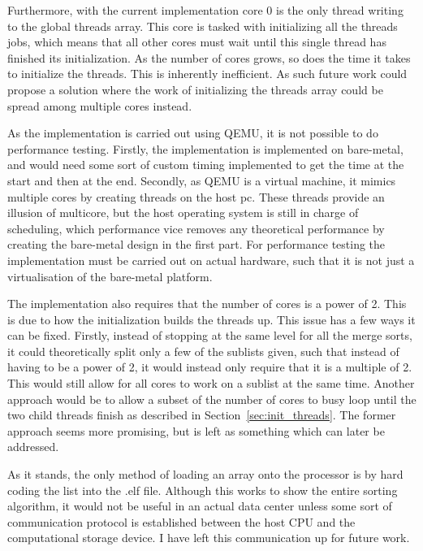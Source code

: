 Furthermore, with the current implementation core 0 is the only thread writing
to the global threads array. This core is tasked with initializing all the
threads jobs, which means that all other cores must wait until this single
thread has finished its initialization. As the number of cores grows, so does
the time it takes to initialize the threads. This is inherently inefficient. As
such future work could propose a solution where the work of initializing the
threads array could be spread among multiple cores instead.

As the implementation is carried out using QEMU, it is not possible to do
performance testing. Firstly, the implementation is implemented on bare-metal,
and would need some sort of custom timing implemented to get the time at the
start and then at the end. Secondly, as QEMU is a virtual machine, it mimics
multiple cores by creating threads on the host pc. These threads provide an
illusion of multicore, but the host operating system is still in charge of
scheduling, which performance vice removes any theoretical performance by
creating the bare-metal design in the first part. For performance testing the
implementation must be carried out on actual hardware, such that it is not just
a virtualisation of the bare-metal platform.

The implementation also requires that the number of cores is a power of 2. This
is due to how the initialization builds the threads up. This issue has a few
ways it can be fixed. Firstly, instead of stopping at the same level for all the
merge sorts, it could theoretically split only a few of the sublists given,
such that instead of having to be a power of 2, it would instead only require
that it is a multiple of 2. This would still allow for all cores to work on a
sublist at the same time. Another approach would be to allow a subset of the
number of cores to busy loop until the two child threads finish as described in
Section~\ref{sec:init_threads}. The former approach seems more promising, but is
left as something which can later be addressed.

As it stands, the only method of loading an array onto the processor is by hard
coding the list into the .elf file. Although this works to show the entire
sorting algorithm, it would not be useful in an actual data center unless some
sort of communication protocol is established between the host CPU and the
computational storage device. I have left this communication up for future work.

